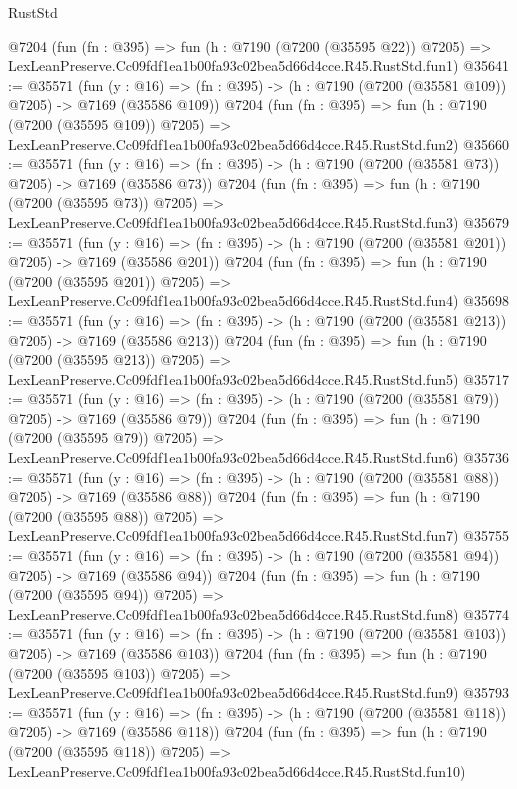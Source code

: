 \begin{lexlean}{RustStd}
\begin{coremodule}
    @7204
    (fun (fn : @395) =>
    fun (h : @7190 (@7200 (@35595 @22)) @7205) =>
    LexLeanPreserve.Cc09fdf1ea1b00fa93c02bea5d66d4cce.R45.RustStd.fun1)
@35641 := @35571
    (fun (y : @16) => (fn : @395) -> (h : @7190 (@7200 (@35581 @109)) @7205) -> @7169 (@35586 @109))
    @7204
    (fun (fn : @395) =>
    fun (h : @7190 (@7200 (@35595 @109)) @7205) =>
    LexLeanPreserve.Cc09fdf1ea1b00fa93c02bea5d66d4cce.R45.RustStd.fun2)
@35660 := @35571
    (fun (y : @16) => (fn : @395) -> (h : @7190 (@7200 (@35581 @73)) @7205) -> @7169 (@35586 @73))
    @7204
    (fun (fn : @395) =>
    fun (h : @7190 (@7200 (@35595 @73)) @7205) =>
    LexLeanPreserve.Cc09fdf1ea1b00fa93c02bea5d66d4cce.R45.RustStd.fun3)
@35679 := @35571
    (fun (y : @16) => (fn : @395) -> (h : @7190 (@7200 (@35581 @201)) @7205) -> @7169 (@35586 @201))
    @7204
    (fun (fn : @395) =>
    fun (h : @7190 (@7200 (@35595 @201)) @7205) =>
    LexLeanPreserve.Cc09fdf1ea1b00fa93c02bea5d66d4cce.R45.RustStd.fun4)
@35698 := @35571
    (fun (y : @16) => (fn : @395) -> (h : @7190 (@7200 (@35581 @213)) @7205) -> @7169 (@35586 @213))
    @7204
    (fun (fn : @395) =>
    fun (h : @7190 (@7200 (@35595 @213)) @7205) =>
    LexLeanPreserve.Cc09fdf1ea1b00fa93c02bea5d66d4cce.R45.RustStd.fun5)
@35717 := @35571
    (fun (y : @16) => (fn : @395) -> (h : @7190 (@7200 (@35581 @79)) @7205) -> @7169 (@35586 @79))
    @7204
    (fun (fn : @395) =>
    fun (h : @7190 (@7200 (@35595 @79)) @7205) =>
    LexLeanPreserve.Cc09fdf1ea1b00fa93c02bea5d66d4cce.R45.RustStd.fun6)
@35736 := @35571
    (fun (y : @16) => (fn : @395) -> (h : @7190 (@7200 (@35581 @88)) @7205) -> @7169 (@35586 @88))
    @7204
    (fun (fn : @395) =>
    fun (h : @7190 (@7200 (@35595 @88)) @7205) =>
    LexLeanPreserve.Cc09fdf1ea1b00fa93c02bea5d66d4cce.R45.RustStd.fun7)
@35755 := @35571
    (fun (y : @16) => (fn : @395) -> (h : @7190 (@7200 (@35581 @94)) @7205) -> @7169 (@35586 @94))
    @7204
    (fun (fn : @395) =>
    fun (h : @7190 (@7200 (@35595 @94)) @7205) =>
    LexLeanPreserve.Cc09fdf1ea1b00fa93c02bea5d66d4cce.R45.RustStd.fun8)
@35774 := @35571
    (fun (y : @16) => (fn : @395) -> (h : @7190 (@7200 (@35581 @103)) @7205) -> @7169 (@35586 @103))
    @7204
    (fun (fn : @395) =>
    fun (h : @7190 (@7200 (@35595 @103)) @7205) =>
    LexLeanPreserve.Cc09fdf1ea1b00fa93c02bea5d66d4cce.R45.RustStd.fun9)
@35793 := @35571
    (fun (y : @16) => (fn : @395) -> (h : @7190 (@7200 (@35581 @118)) @7205) -> @7169 (@35586 @118))
    @7204
    (fun (fn : @395) =>
    fun (h : @7190 (@7200 (@35595 @118)) @7205) =>
    LexLeanPreserve.Cc09fdf1ea1b00fa93c02bea5d66d4cce.R45.RustStd.fun10)

\end{coremodule}
\end{lexlean}

